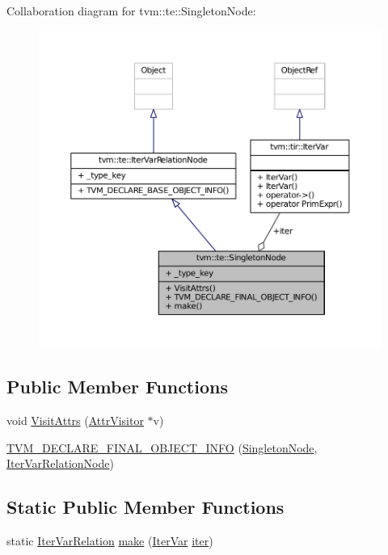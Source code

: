 Collaboration diagram for tvm\+:\+:te\+:\+:Singleton\+Node\+:
\nopagebreak
\begin{figure}[H]
\begin{center}
\leavevmode
\includegraphics[width=350pt]{classtvm_1_1te_1_1SingletonNode__coll__graph}
\end{center}
\end{figure}
\subsection*{Public Member Functions}
\begin{DoxyCompactItemize}
\item 
void \hyperlink{classtvm_1_1te_1_1SingletonNode_a224061c98cfd22f25435e5ac9b0f8228}{Visit\+Attrs} (\hyperlink{classtvm_1_1AttrVisitor}{Attr\+Visitor} $\ast$v)
\item 
\hyperlink{classtvm_1_1te_1_1SingletonNode_aa1bc95f455d8579cd48a0264f90d1774}{T\+V\+M\+\_\+\+D\+E\+C\+L\+A\+R\+E\+\_\+\+F\+I\+N\+A\+L\+\_\+\+O\+B\+J\+E\+C\+T\+\_\+\+I\+N\+FO} (\hyperlink{classtvm_1_1te_1_1SingletonNode}{Singleton\+Node}, \hyperlink{classtvm_1_1te_1_1IterVarRelationNode}{Iter\+Var\+Relation\+Node})
\end{DoxyCompactItemize}
\subsection*{Static Public Member Functions}
\begin{DoxyCompactItemize}
\item 
static \hyperlink{classtvm_1_1te_1_1IterVarRelation}{Iter\+Var\+Relation} \hyperlink{classtvm_1_1te_1_1SingletonNode_aa9a0a30449bb325fa59310880e3f1510}{make} (\hyperlink{classtvm_1_1tir_1_1IterVar}{Iter\+Var} \hyperlink{classtvm_1_1te_1_1SingletonNode_a4a33beb28fc1394654684ad92aca226d}{iter})
\end{DoxyCompactItemize}
